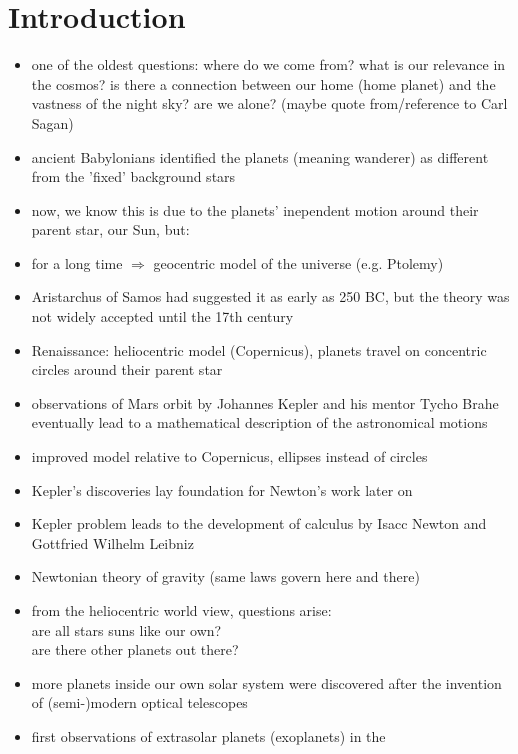 
\chapter{Introduction}

  \begin{itemize}
    \item one of the oldest questions: where do we come from? what is our 
      relevance in the cosmos? is there a connection between our home 
      (home planet) and the vastness of the night sky? are we alone?
      (maybe quote from/reference to Carl Sagan)
    \item ancient Babylonians identified the planets (meaning wanderer)
      as different from the 'fixed' background stars
    \item now, we know this is due to the planets' inependent motion around 
      their parent star, our Sun, but:
    \item for a long time $\Rightarrow$ geocentric model of the 
      universe (e.g. Ptolemy)
    \item Aristarchus of Samos had suggested it as early as 250 BC, but the 
      theory was not widely accepted until the 17th century
    \item Renaissance: heliocentric model (Copernicus), planets travel on 
      concentric circles around their parent star
    \item observations of Mars orbit by Johannes Kepler and his mentor 
      Tycho Brahe eventually lead to a mathematical description of 
      the astronomical motions
    \item improved model relative to Copernicus, ellipses instead of circles
    \item Kepler's discoveries lay foundation for Newton's work later on
    \item Kepler problem leads to the development of calculus by 
      Isacc Newton and Gottfried Wilhelm Leibniz
    \item Newtonian theory of gravity (same laws govern here and there)
    \item from the heliocentric world view, questions arise: \\
      are all stars suns like our own? \\
      are there other planets out there?
    \item more planets inside our own solar system were discovered after the 
      invention of (semi-)modern optical telescopes
    \item first observations of extrasolar planets (exoplanets) in the 

\end{itemize}
